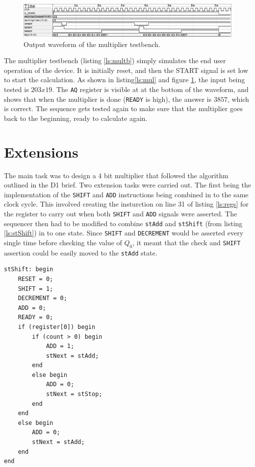\documentclass[a4paper,11pt]{article}
\begin{document}
\begin{figure}[H]
    \centering
        \includegraphics[scale=0.65]{../out/multiplier_tb.eps}
    \caption{Output waveform of the multiplier testbench.}
    \label{fig:multbw}
\end{figure}

The multiplier testbench (listing \ref{ls:multb}) simply simulates the end user operation of the device. It is initially reset, and then the START signal is set low to start the calculation. As shown in listing\ref{ls:mul} and figure \ref{fig:multbw}, the input being tested is $203x19$. The \lstinline{AQ} register is visible at at the bottom of the waveform, and shows that when the multiplier is done (\lstinline{READY} is high), the answer is $3857$, which is correct. The sequence gets tested again to make sure that the multiplier goes back to the beginning, ready to calculate again.

\section{Extensions}

The main task was to design a 4 bit multiplier that followed the algorithm outlined in the D1 brief. Two extension tasks were carried out. The first being the implementation of the \lstinline{SHIFT} and \lstinline{ADD} instructions being combined in to the same clock cycle. This involved creating the insturction on line 31 of listing \ref{ls:regs} for the register to carry out when both \lstinline{SHIFT} and \lstinline{ADD} signals were asserted. The sequencer then had to be modified to combine \lstinline{stAdd} and \lstinline{stShift} (from listing \ref{ls:stShift}) in to one state. Since \lstinline{SHIFT} and \lstinline{DECREMENT} would be asserted every single time before checking the value of $Q_0$, it meant that the check and \lstinline{SHIFT} assertion could be easily moved to the \lstinline{stAdd} state.

\begin{lstlisting}
stShift: begin
    RESET = 0;
    SHIFT = 1;
    DECREMENT = 0;
    ADD = 0;
    READY = 0;
    if (register[0]) begin
        if (count > 0) begin
            ADD = 1;
            stNext = stAdd;
        end
        else begin
            ADD = 0;
            stNext = stStop;
        end
    end
    else begin
        ADD = 0;
        stNext = stAdd;
    end
end
\end{lstlisting}
\end{document}
